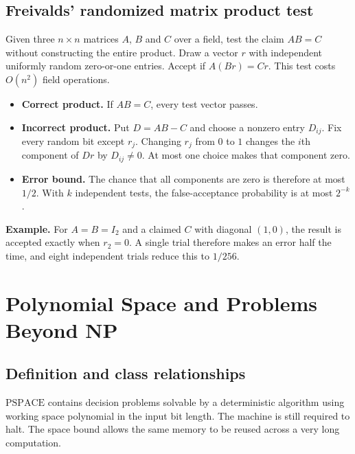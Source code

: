 \documentclass[12pt,a4paper]{article}
\begin{document}
\subsection{Freivalds' randomized matrix product test}
Given three $n\times n$ matrices $A$, $B$ and $C$ over a field, test the claim $AB=C$ without constructing the entire product. Draw a vector $r$ with independent uniformly random zero-or-one entries. Accept if $A(Br)=Cr$. This test costs $O(n^2)$ field operations.
\begin{tcolorbox}[examplebox, title={Why one trial accepts an incorrect product with probability at most one half}]
\begin{itemize}[leftmargin=*, itemsep=2pt]
  \item \textbf{Correct product.} If $AB=C$, every test vector passes.
  \item \textbf{Incorrect product.} Put $D=AB-C$ and choose a nonzero entry $D_{ij}$. Fix every random bit except $r_j$. Changing $r_j$ from $0$ to $1$ changes the $i$th component of $Dr$ by $D_{ij}\ne0$. At most one choice makes that component zero.
  \item \textbf{Error bound.} The chance that all components are zero is therefore at most $1/2$. With $k$ independent tests, the false-acceptance probability is at most $2^{-k}$.
\end{itemize}
\end{tcolorbox}

\textbf{Example.} For $A=B=I_2$ and a claimed $C$ with diagonal $(1,0)$, the result is accepted exactly when $r_2=0$. A single trial therefore makes an error half the time, and eight independent trials reduce this to $1/256$.

\section{Polynomial Space and Problems Beyond NP}
\subsection{Definition and class relationships}
\begin{tcolorbox}[defbox, title={PSPACE}]
$\mathrm{PSPACE}$ contains decision problems solvable by a deterministic algorithm using working space polynomial in the input bit length. The machine is still required to halt. The space bound allows the same memory to be reused across a very long computation.
\end{tcolorbox}
\end{document}
